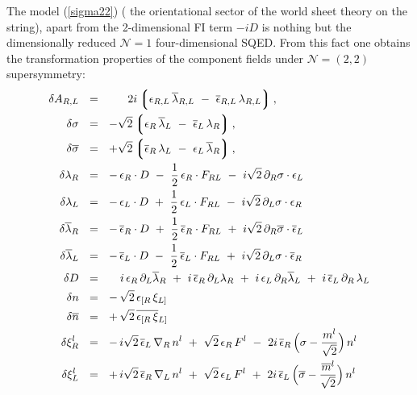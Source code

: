 \documentclass[12pt]{article}
\newcommand{\ntwot}{${\mathcal N}= \left(2,2\right) $ }
\newcommand{\none}{${\mathcal N}=1$ }
\newcommand{\p}{\partial}
\newcommand{\ov}{\overline}
\newcommand{\lgr}{\left\lgroup}
\newcommand{\rgr}{\right\rgroup}
\newcommand{\lar}{\lambda_R}
\newcommand{\lal}{\lambda_L}
\newcommand{\larl}{\lambda_{R,L}}
\newcommand{\blar}{\ov{\lambda}{}_R}
\newcommand{\blal}{\ov{\lambda}{}_L}
\newcommand{\blarl}{\ov{\lambda}{}_{R,L}}
\newcommand{\eer}{\epsilon_R}
\newcommand{\eel}{\epsilon_L}
\newcommand{\eerl}{\epsilon_{R,L}}
\newcommand{\beer}{\ov{\epsilon}{}_R}
\newcommand{\beel}{\ov{\epsilon}{}_L}
\newcommand{\beerl}{\ov{\epsilon}{}_{R,L}}
\begin{document}
     The model (\ref{sigma22}) ( the
     orientational sector of the world sheet theory
     on the string),
      apart from the 2-dimensional FI term $ - i D $ is nothing but
        the dimensionally reduced \none four-dimensional SQED.
        From this fact one obtains the transformation properties of the component fields under 
        \ntwot supersymmetry:
\begin{align}
%
\notag
  \delta A_{R,L} & ~~=~~ ~~~~~ 2i \lgr  \eerl\, \blarl
                              ~-~ \beerl\, \larl \rgr  , \\
%
\notag
  \delta\sigma & ~~=~~ -\sqrt{2}
                              \lgr \eer\, \blal ~-~ \beel\,\lar \rgr , 
                              \\
%
\notag
  \delta\ov{\sigma} & ~~=~~ +\sqrt{2}
                              \lgr \beer\,\lal ~-~ \eel\,\blar \rgr ,
                              \\
%
\notag
  \delta\lar & ~~=~~ -\,\eer\cdot D ~-~ \frac{1}{2}\,\eer\cdot F_{RL} 
                     ~-~ i\sqrt{2}\, \p_R\sigma \cdot \eel
                     \\
%
\notag
  \delta\lal & ~~=~~ -\,\eel\cdot D ~+~ \frac{1}{2}\,\eel\cdot F_{RL} 
                     ~-~ i\sqrt{2}\, \p_L\sigma \cdot \eer
                     \\
%
\notag
  \delta\blar & ~~=~~ -\,\beer\cdot D ~+~ \frac{1}{2}\,\beer\cdot F_{RL} 
                     ~+~ i\sqrt{2}\, \p_R\ov{\sigma} \cdot \beel
                     \\
%
\notag
  \delta\blal & ~~=~~ -\,\beel\cdot D ~-~ \frac{1}{2}\,\beel\cdot F_{RL}
                     ~+~ i\sqrt{2}\, \p_L\sigma \cdot \beer
                     \\
%
\notag
  \delta D & ~~=~~ ~~~i\,\eer\, \p_L \blar ~+~ i\,\beer\, \p_L\lar 
                   ~+~ i\,\eel\, \p_R \blal ~+~ i\,\beel\,\p_R\,\lal
                   \\
%
\label{msusy}
  \delta n & ~~=~~ -\,\sqrt{2}\, \epsilon_{[R}\, \xi_{L]} 
                   \\
%
\notag
  \delta\ov{n} & ~~=~~ +\,\sqrt{2}\,\ov{\epsilon_{[R}\, \xi}{}_{L]}
                   \\
%
\notag
  \delta\xi_R^l & ~~=~~
     -\, i\sqrt{2}\, \beel\, \nabla_R\, n^l ~+~ \sqrt{2}\, \eer\, F^l 
     ~-~ 2i\, \beer\, \Bigl(\sigma - \frac{m^l}{\sqrt{2}}\Bigr)\, n^l
     \\
%
\notag
  \delta\xi_L^l & ~~=~~
     +\, i\sqrt{2}\, \beer\, \nabla_L\, n^l ~+~ \sqrt{2}\, \eel\, F^l
     ~+~ 2i\, \beel\, \Bigl(\ov{\sigma} - \frac{\ov{m}{}^l}{\sqrt{2}}\Bigr)\, n^l

\end{align}
\end{document}
